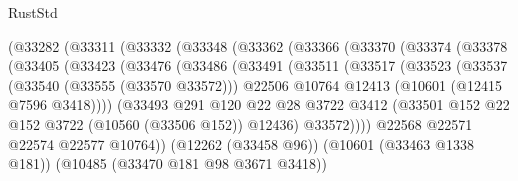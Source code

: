 \begin{lexlean}{RustStd}
\begin{coremodule}
                      (@33282
                        (@33311
                          (@33332
                            (@33348
                              (@33362
                                (@33366
                                  (@33370
                                    (@33374
                                      (@33378
                                        (@33405
                                          (@33423
                                            (@33476
                                              (@33486
                                                (@33491
                                                  (@33511
                                                    (@33517
                                                      (@33523
                                                        (@33537
                                                          (@33540 (@33555 (@33570 @33572)))
                                                          @22506
                                                          @10764
                                                          @12413
                                                          (@10601 (@12415 @7596 @3418))))
                                                      (@33493
                                                        @291
                                                        @120
                                                        @22
                                                        @28
                                                        @3722
                                                        @3412
                                                        (@33501
                                                          @152
                                                          @22
                                                          @152
                                                          @3722
                                                          (@10560 (@33506 @152))
                                                          @12436)
                                                        @33572))))
                                                @22568
                                                @22571
                                                @22574
                                                @22577
                                                @10764))
                                            (@12262 (@33458 @96))
                                            (@10601 (@33463 @1338 @181))
                                            (@10485 (@33470 @181 @98 @3671 @3418))

\end{coremodule}
\end{lexlean}
